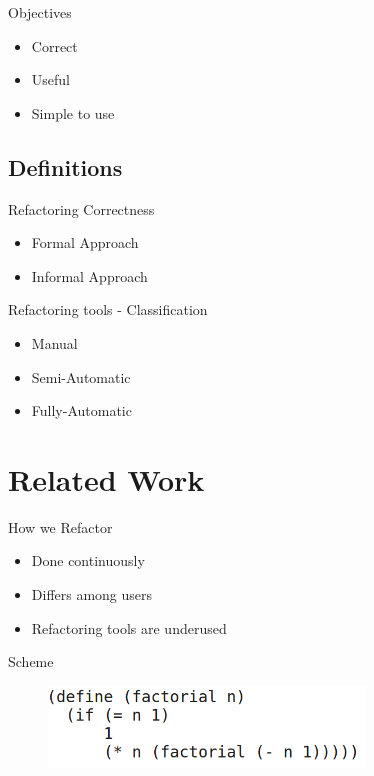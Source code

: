 \documentclass[xcolor=dvipsnames, 14pt]{beamer}
\begin{document}
\begin{frame}{Objectives}%
  \begin{itemize}
  \setlength\itemsep{2em}
  \item {
    Correct
  }
  \item {
    Useful
  }
  \item {
    Simple to use
  }
  \end{itemize}
\end{frame}

\subsection{Definitions}
\begin{frame}{Refactoring Correctness}
\begin{itemize}
\setlength\itemsep{2em}
\item Formal Approach
\item Informal Approach
\end{itemize}
\end{frame}
\begin{frame}{Refactoring tools - Classification}
  \begin{itemize}
  \setlength\itemsep{2em}
  \item {
    Manual
  }
  \item {
    Semi-Automatic
  }
  \item {
    Fully-Automatic
  }
  \end{itemize}
\end{frame}
\section{Related Work}

\begin{frame}{How we Refactor}
  \begin{itemize}
  \setlength\itemsep{2em}
  \item {
  Done continuously
  }
  \item {
    Differs among users
  }
  \item {
    Refactoring tools are underused
  }
  \end{itemize}
\end{frame}
\begin{frame}{Scheme}
    \begin{figure}[htbp]
      \centering
      \includegraphics[width=0.75\textwidth]{img/SchemeCode2.png}
      \label{fig:Scheme}
    \end{figure}
\end{frame}
\end{document}
